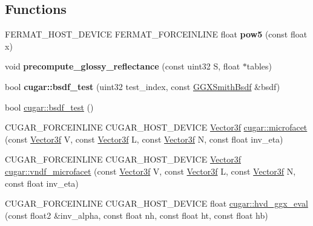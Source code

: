 \subsection*{Functions}
\begin{DoxyCompactItemize}
\item 
\mbox{\label{group___b_s_d_f_module_ga452befdd31de89c5de5863c06d2cc901}} 
F\+E\+R\+M\+A\+T\+\_\+\+H\+O\+S\+T\+\_\+\+D\+E\+V\+I\+CE F\+E\+R\+M\+A\+T\+\_\+\+F\+O\+R\+C\+E\+I\+N\+L\+I\+NE float {\bfseries pow5} (const float x)
\item 
\mbox{\label{group___b_s_d_f_module_gad2e2716498c2e506ddb0346bcd76a577}} 
void {\bfseries precompute\+\_\+glossy\+\_\+reflectance} (const uint32 S, float $\ast$tables)
\item 
\mbox{\label{group___b_s_d_f_module_ga406d45267a7c015d38cd6db45c8391fb}} 
bool {\bfseries cugar\+::bsdf\+\_\+test} (uint32 test\+\_\+index, const \hyperlink{structcugar_1_1_g_g_x_smith_bsdf}{G\+G\+X\+Smith\+Bsdf} \&bsdf)
\item 
bool \hyperlink{group___b_s_d_f_module_ga6f553010172240343aa0890f04b7192c}{cugar\+::bsdf\+\_\+test} ()
\item 
C\+U\+G\+A\+R\+\_\+\+F\+O\+R\+C\+E\+I\+N\+L\+I\+NE C\+U\+G\+A\+R\+\_\+\+H\+O\+S\+T\+\_\+\+D\+E\+V\+I\+CE \hyperlink{structcugar_1_1_vector}{Vector3f} \hyperlink{group___b_s_d_f_module_gae47d332728711dde1d05b721b74267f7}{cugar\+::microfacet} (const \hyperlink{structcugar_1_1_vector}{Vector3f} V, const \hyperlink{structcugar_1_1_vector}{Vector3f} L, const \hyperlink{structcugar_1_1_vector}{Vector3f} N, const float inv\+\_\+eta)
\item 
C\+U\+G\+A\+R\+\_\+\+F\+O\+R\+C\+E\+I\+N\+L\+I\+NE C\+U\+G\+A\+R\+\_\+\+H\+O\+S\+T\+\_\+\+D\+E\+V\+I\+CE \hyperlink{structcugar_1_1_vector}{Vector3f} \hyperlink{group___b_s_d_f_module_gaa871796466d7998c178e28e2eccd7248}{cugar\+::vndf\+\_\+microfacet} (const \hyperlink{structcugar_1_1_vector}{Vector3f} V, const \hyperlink{structcugar_1_1_vector}{Vector3f} L, const \hyperlink{structcugar_1_1_vector}{Vector3f} N, const float inv\+\_\+eta)
\item 
C\+U\+G\+A\+R\+\_\+\+F\+O\+R\+C\+E\+I\+N\+L\+I\+NE C\+U\+G\+A\+R\+\_\+\+H\+O\+S\+T\+\_\+\+D\+E\+V\+I\+CE float \hyperlink{group___b_s_d_f_module_ga985268a447aa898cd2f2e1c792d9ddff}{cugar\+::hvd\+\_\+ggx\+\_\+eval} (const float2 \&inv\+\_\+alpha, const float nh, const float ht, const float hb)

\end{DoxyCompactItemize}
